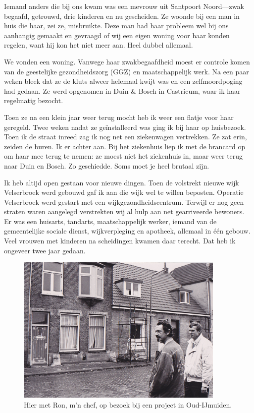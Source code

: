\documentclass[12pt,twoside, openright]{memoir}
\begin{document}
Iemand anders die bij ons kwam was een mevrouw uit Santpoort Noord---zwak begaafd, getrouwd, drie kinderen en nu gescheiden. Ze woonde bij een man in huis die haar, zei ze, misbruikte. Deze man had haar probleem wel bij ons aanhangig gemaakt en gevraagd of wij een eigen woning voor haar konden regelen, want hij kon het niet meer aan. Heel dubbel allemaal. 

We vonden een woning. Vanwege haar zwakbegaafdheid moest er controle komen van de geestelijke gezondheidszorg (GGZ) en maatschappelijk werk. Na een paar weken bleek dat ze de kluts alweer helemaal kwijt was en een zelfmoordpoging had gedaan. Ze werd opgenomen in Duin \& Bosch in Castricum, waar ik haar regelmatig bezocht. 

Toen ze na een klein jaar weer terug mocht heb ik weer een flatje voor haar geregeld. Twee weken nadat ze geïnstalleerd was ging ik bij haar op huisbezoek. Toen ik de straat inreed zag ik nog net een ziekenwagen vertrekken. Ze zat erin, zeiden de buren. Ik er achter aan. Bij het ziekenhuis liep ik met de brancard op om haar mee terug te nemen: ze moest niet het ziekenhuis in, maar weer terug naar Duin en Bosch. Zo geschiedde. Soms moet je heel brutaal zijn.

Ik heb altijd open gestaan voor nieuwe dingen. Toen de volstrekt nieuwe wijk Velserbroek werd gebouwd gaf ik aan die wijk wel te willen beposten. Operatie Velserbroek werd gestart met een wijkgezondheidscentrum. Terwijl er nog geen straten waren aangelegd verstrekten wij al hulp aan net gearriveerde bewoners. Er was een huisarts, tandarts, maatschappelijk werker, iemand van de gemeentelijke sociale dienst, wijkverpleging en apotheek, allemaal in één gebouw. Veel vrouwen met kinderen na scheidingen kwamen daar terecht. Dat heb ik ongeveer twee jaar gedaan. 

\begin{figure}
\centering
\includegraphics[width=0.9\textwidth]{img/ch46/velse_0001}
\caption*{\footnotesize Hier met Ron, m’n chef, op bezoek bij een project in Oud-IJmuiden.}
\end{figure}
\end{document}
